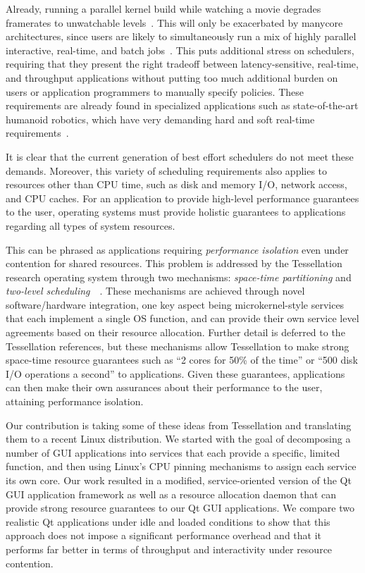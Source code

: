 \documentclass[letterpaper,twocolumn,11pt]{article}
\begin{document}
Already, running a parallel kernel build while watching a movie degrades framerates to unwatchable levels~\cite{DBLP:conf/osdi/YangLBKM08}. This will only be exacerbated by manycore architectures, since users are likely to simultaneously run a mix of highly parallel interactive, real-time, and batch jobs~\cite{liu09tessellation}. This puts additional stress on schedulers, requiring that they present the right tradeoff between latency-sensitive, real-time, and throughput applications without putting too much additional burden on users or application programmers to manually specify policies. These requirements are already found in specialized applications such as state-of-the-art humanoid robotics, which have very demanding hard and soft real-time requirements~\cite{Yoo:2009:RPD:1618617.1618723, Kaneko04humanoidrobot}. 

It is clear that the current generation of best effort schedulers do not meet these demands. Moreover, this variety of scheduling requirements also applies to resources other than CPU time, such as disk and memory I/O, network access, and CPU caches. For an application to provide high-level performance guarantees to the user, operating systems must provide holistic guarantees to applications regarding all types of system resources.

This can be phrased as applications requiring \emph{performance isolation} even under contention for shared resources. This problem is addressed by the Tessellation research operating system through two mechanisms: \emph{space-time partitioning} and \emph{two-level scheduling}~\cite{liu09tessellation}~\cite{tessellation-hotpar10}. These mechanisms are achieved through novel software/hardware integration, one key aspect being microkernel-style services that each implement a single OS function, and can provide their own service level agreements based on their resource allocation. Further detail is deferred to the Tessellation references, but these mechanisms allow Tessellation to make strong space-time resource guarantees such as ``2 cores for 50\% of the time'' or ``500 disk I/O operations a second'' to applications. Given these guarantees, applications can then make their own assurances about their performance to the user, attaining performance isolation.

Our contribution is taking some of these ideas from Tessellation and translating them to a recent Linux distribution. We started with the goal of decomposing a number of GUI applications into services that each provide a specific, limited function, and then using Linux's CPU pinning mechanisms to assign each service its own core. Our work resulted in a modified, service-oriented version of the Qt GUI application framework as well as a resource allocation daemon that can provide strong resource guarantees to our Qt GUI applications. We compare two realistic Qt applications under idle and loaded conditions to show that this approach does not impose a significant performance overhead and that it performs far better in terms of throughput and interactivity under resource contention.
\end{document}
